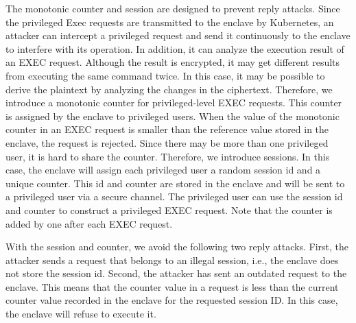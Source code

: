 The monotonic counter and session are designed to prevent reply attacks. Since the privileged Exec requests are transmitted to the enclave by Kubernetes, an attacker can intercept a privileged request and send it continuously to the enclave to interfere with its operation. In addition, it can analyze 
the execution result of an EXEC request. Although the result is encrypted, it may get different results from executing the same command twice. In this case, it may be possible to derive the plaintext by analyzing the changes in the ciphertext. Therefore, we introduce a monotonic counter for 
privileged-level EXEC requests. This counter is assigned by the enclave to privileged users. When the value of the monotonic counter in an EXEC request is smaller than the reference value stored in the enclave, the request is rejected. Since there may be more than one privileged user, it is 
hard to share the counter. Therefore, we introduce sessions. In this case, the enclave will assign each privileged user a random session id and a unique counter. This id and counter are stored in the enclave and will be sent to a privileged user via a secure channel. The privileged user can 
use the session id and counter to construct a privileged EXEC request. Note that the counter is added by one after each EXEC request.

With the session and counter, we avoid the following two reply attacks. First, the attacker sends a request that belongs to an illegal session, i.e., the enclave does not store the session id. Second, the attacker has sent an outdated request to the enclave. This means that the counter value in a 
request is less than the current counter value recorded in the enclave for the requested session ID. In this case, the enclave will refuse to execute it.

